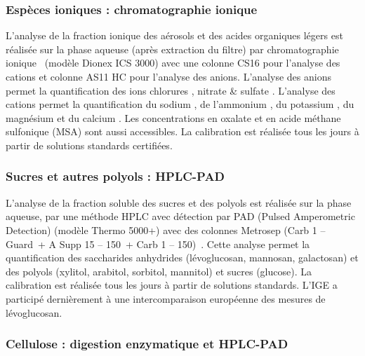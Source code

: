 \subsubsection{Espèces ioniques : chromatographie ionique}%
\label{ssub:espèces_ioniques_par_chromatographie}

L'analyse de la fraction ionique des aérosols et des acides organiques légers est réalisée
sur la phase aqueuse (après extraction du filtre) par chromatographie
ionique~\autocite{jaffrezoSeasonal2005,cenAmbient2017b} (modèle Dionex ICS 3000) avec une
colonne
CS16 pour l’analyse des cations et colonne AS11 HC pour l’analyse des anions. L’analyse
des anions permet la quantification des ions chlorures , nitrate  \&
sulfate . L’analyse des cations permet la quantification du sodium , de
l'ammonium , du potassium , du magnésium  et du calcium
. 
Les concentrations en oxalate et en acide méthane sulfonique (MSA) sont aussi accessibles.
La calibration est réalisée tous les jours à partir de solutions standards certifiées.

\subsubsection{Sucres et autres polyols : HPLC-PAD}%
\label{ssub:sucres_et_autres_polyols_hplc-pad}

L’analyse de la fraction soluble des sucres et des polyols est réalisée sur la phase
aqueuse, par une méthode HPLC avec détection par PAD (Pulsed Amperometric Detection)
(modèle Thermo 5000+) avec des colonnes Metrosep (Carb 1 – Guard + A Supp 15 – 150 + Carb
1 – 150)~\autocite{piotQuantification2012,wakedSource2014}.
Cette analyse permet la quantification des saccharides anhydrides (lévoglucosan,
mannosan, galactosan) et des polyols (xylitol, arabitol, sorbitol, mannitol) et sucres
(glucose). La calibration est réalisée tous les jours à partir de solutions standards.
L’IGE a participé dernièrement à une intercomparaison européenne des mesures de
lévoglucosan.

\subsubsection{Cellulose : digestion enzymatique et HPLC-PAD}%
\label{ssub:cellulose_}

